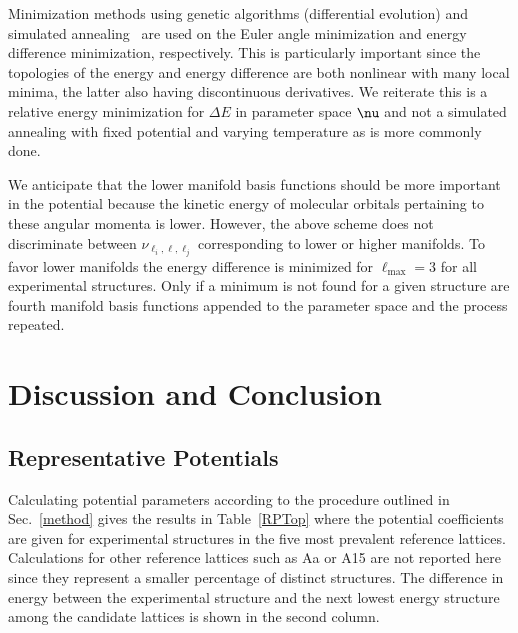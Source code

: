 \documentclass[preprint]{iucr}              %
\newcommand{\mb}[1]{\ensuremath{\mbox{\boldmath $ #1 $}}}
\begin{document}
Minimization methods using genetic algorithms (differential
evolution) and simulated annealing~\cite{Kirkpatrick83} are used on
the Euler angle minimization and energy difference minimization,
respectively. This is particularly important since the topologies of
the energy and energy difference are both nonlinear with many local
minima, the latter also having discontinuous derivatives. We
reiterate this is a relative energy minimization for $\Delta E$ in
parameter space $\mb{\nu}$ and not a simulated annealing with fixed
potential and varying temperature as is more commonly done.

We anticipate that the lower manifold basis functions should be more
important in the potential because the kinetic energy of molecular
orbitals pertaining to these angular momenta is lower. However, the
above scheme does not discriminate between
$\nu_{\ell_i,\ell,\ell_j}$ corresponding to lower or higher
manifolds.  To favor lower manifolds the energy difference is
minimized for $\ell_{\mathrm{max}}=3$ for all experimental
structures. Only if a minimum is not found for a given structure are
fourth manifold basis functions appended to the parameter space and
the process repeated.


\section{Discussion and Conclusion}
\label{discussion}

\subsection{Representative Potentials}
\label{representative_potentials}

Calculating potential parameters according to the procedure outlined
in Sec.~\ref{method} gives the results in Table~\ref{RPTop} where
the potential coefficients are given for experimental structures in
the five most prevalent reference lattices. Calculations for other
reference lattices such as Aa or A15 are not reported here since
they represent a smaller percentage of distinct structures. The
difference in energy between the experimental structure and the next
lowest energy structure among the candidate lattices is shown in the
second column.
\end{document}
